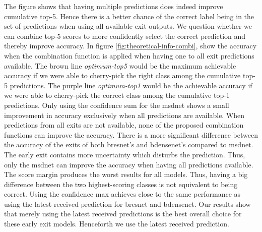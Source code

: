 The figure shows that having multiple predictions does indeed improve cumulative top-5. Hence there is a better chance of the correct label being in the set of predictions when using all available exit outputs. We question whether we can combine top-5 scores to more confidently select the correct prediction and thereby improve accuracy. 
In figure \ref{fig:theoretical-info-combi}, show the accuracy when the combination function is applied when having one to all exit predictions available. The brown line \textit{optimum-top5} would be the maximum achievable accuracy if we were able to cherry-pick the right class among the cumulative top-5 predictions. The purple line \textit{optimum-top1} would be the achievable accuracy if we were able to cherry-pick the correct class among the cumulative top-1 predictions. 
Only using the confidence sum for the \gls{msdnet} shows a small improvement in accuracy exclusively when all predictions are available. When predictions from all exits are not available, none of the proposed combination functions can improve the accuracy. There is a more significant difference between the accuracy of the exits of both \gls{bresnet}'s and \gls{bdensenet}'s compared to \gls{msdnet}. The early exit contains more uncertainty which disturbs the prediction. Thus, only the \gls{msdnet} can improve the accuracy when having all predictions available.
The score margin produces the worst results for all models. Thus, having a big difference between the two highest-scoring classes is not equivalent to being correct. Using the confidence max achieves close to the same performance as using the latest received prediction for \gls{bresnet} and \gls{bdensenet}. Our results show that merely using the latest received predictions is the best overall choice for these early exit models. Henceforth we use the latest received prediction.

